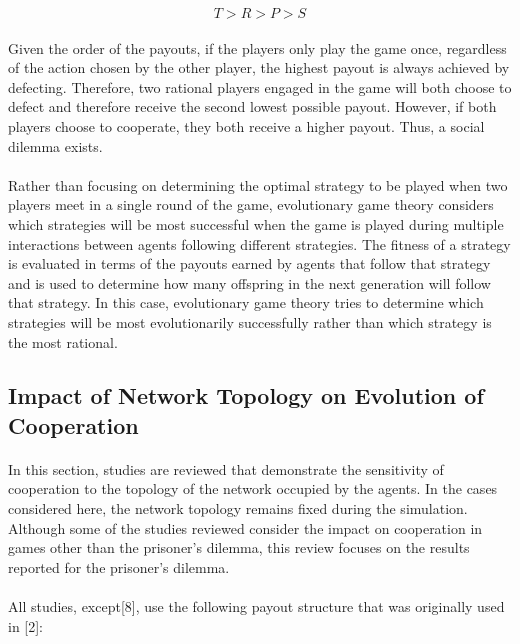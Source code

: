 \documentclass{article}
\begin{document}
    \begin{equation}
    	T > R > P > S
    \end{equation}
    
    \paragraph{}Given the order of the payouts, if the players only play the game once, regardless of the action chosen by the other player, the highest payout is always achieved by defecting.  Therefore, two rational players engaged in the game will both choose to defect and therefore receive the second lowest possible payout.  However, if both players choose to cooperate, they both receive a higher payout.  Thus, a social dilemma exists.
    \paragraph{}Rather than focusing on determining the optimal strategy to be played when two players meet in a single round of the game, evolutionary game theory considers which strategies will be most successful when the game is played during multiple interactions between agents following different strategies.  The fitness of a strategy is evaluated in terms of the payouts earned by agents that follow that strategy and is used to determine how many offspring in the next generation will follow that strategy.  In this case, evolutionary game theory tries to determine which strategies will be most evolutionarily successfully rather than which strategy is the most rational.

    \subsection{Impact of Network Topology on Evolution of Cooperation}
    \paragraph{}In this section, studies are reviewed that demonstrate the sensitivity of cooperation to the topology of the network occupied by the agents.  In the cases considered here, the network topology remains fixed during the simulation.  Although some of the studies reviewed consider the impact on cooperation in games other than the prisoner’s dilemma, this review focuses on the results reported for the prisoner’s dilemma.
    \paragraph{}All studies, except[8], use the following payout structure that was originally used in [2]:
\end{document}
